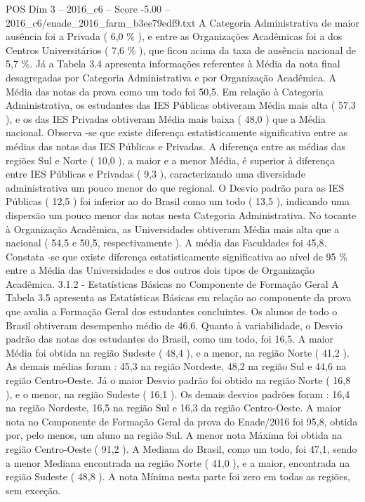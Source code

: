 \begin{textsample}{POS Dim 3 – 2016\_c6 – Score -5.00 – 2016\_c6/enade\_2016\_farm\_b3ee79edf9.txt}
A Categoria Administrativa de maior ausência foi a Privada ( 6,0 \% ), e entre as Organizações Acadêmicas foi a dos Centros Universitários ( 7,6 \% ), que ficou acima da taxa de ausência nacional de 5,7 \%.
Já a Tabela 3.4 apresenta informações referentes à Média da nota final desagregadas por Categoria Administrativa e por Organização Acadêmica.
A Média das notas da prova como um todo foi 50,5.
Em relação à Categoria Administrativa, os estudantes das IES Públicas obtiveram Média mais alta ( 57,3 ), e os das IES Privadas obtiveram Média mais baixa ( 48,0 ) que a Média nacional.
Observa -se que existe diferença estatisticamente significativa entre as médias das notas das IES Públicas e Privadas.
A diferença entre as médias das regiões Sul e Norte ( 10,0 ), a maior e a menor Média, é superior à diferença entre IES Públicas e Privadas ( 9,3 ), caracterizando uma diversidade administrativa um pouco menor do que regional.
O Desvio padrão para as IES Públicas ( 12,5 ) foi inferior ao do Brasil como um todo ( 13,5 ), indicando uma dispersão um pouco menor das notas nesta Categoria Administrativa.
No tocante à Organização Acadêmica, as Universidades obtiveram Média mais alta que a nacional ( 54,5 e 50,5, respectivamente ).
A média das Faculdades foi 45,8.
Constata -se que existe diferença estatisticamente significativa ao nível de 95 \% entre a Média das Universidades e dos outros dois tipos de Organização Acadêmica. 3.1.2 - Estatísticas Básicas no Componente de Formação Geral A Tabela 3.5 apresenta as Estatísticas Básicas em relação ao componente da prova que avalia a Formação Geral dos estudantes concluintes.
Os alunos de todo o Brasil obtiveram desempenho médio de 46,6.
Quanto à variabilidade, o Desvio padrão das notas dos estudantes do Brasil, como um todo, foi 16,5.
A maior Média foi obtida na região Sudeste ( 48,4 ), e a menor, na região Norte ( 41,2 ).
As demais médias foram : 45,3 na região Nordeste, 48,2 na região Sul e 44,6 na região Centro-Oeste.
Já o maior Desvio padrão foi obtido na região Norte ( 16,8 ), e o menor, na região Sudeste ( 16,1 ).
Os demais desvios padrões foram : 16,4 na região Nordeste, 16,5 na região Sul e 16,3 da região Centro-Oeste.
A maior nota no Componente de Formação Geral da prova do Enade/2016 foi 95,8, obtida por, pelo menos, um aluno na região Sul.
A menor nota Máxima foi obtida na região Centro-Oeste ( 91,2 ).
A Mediana do Brasil, como um todo, foi 47,1, sendo a menor Mediana encontrada na região Norte ( 41,0 ), e a maior, encontrada na região Sudeste ( 48,8 ).
A nota Mínima nesta parte foi zero em todas as regiões, sem exceção.

\end{textsample}
